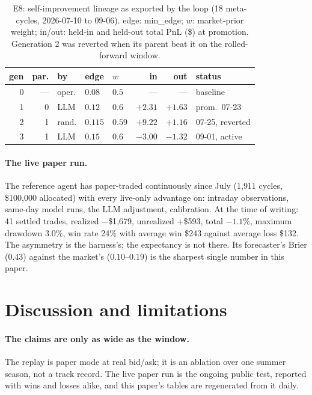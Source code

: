 \documentclass[sigconf,review,anonymous]{acmart}
\begin{document}
\begin{table}[t]
\centering
\small
\begin{tabular}{@{}rrlllrrl@{}}
\toprule
\textbf{gen} & \textbf{par.} & \textbf{by} & \textbf{edge} & \textbf{$w$} & \textbf{in} & \textbf{out} & \textbf{status} \\
\midrule
0 & --- & oper. & $0.08$ & $0.5$ & --- & --- & baseline \\
1 & 0 & LLM & $0.12$ & $0.6$ & $+2.31$ & $+1.63$ & prom.\ 07-23 \\
2 & 1 & rand. & $0.115$ & $0.59$ & $+9.22$ & $+1.16$ & 07-25, reverted \\
3 & 1 & LLM & $0.15$ & $0.6$ & $-3.00$ & $-1.32$ & 09-01, active \\
\bottomrule
\end{tabular}
\caption{E8: self-improvement lineage as exported by the loop (18 meta-cycles,
2026-07-10 to 09-06). edge: min\_edge; $w$: market-prior weight; in/out:
held-in and held-out total PnL (\$) at promotion. Generation 2 was reverted when its
parent beat it on the rolled-forward window.}
\label{tab:lineage}
\end{table}

\paragraph{The live paper run.}
\label{sec:live}
The reference agent has paper-traded continuously since July (1{,}911 cycles,
\$100{,}000 allocated) with every live-only advantage on: intraday
observations, same-day model runs, the LLM adjustment, calibration. At the
time of writing: 41 settled trades, realized $-$\$1{,}679, unrealized
$+$\$593, total $-1.1\%$, maximum drawdown $3.0\%$, win rate 24\% with average
win \$243 against average loss \$132. The asymmetry is the harness's; the
expectancy is not there. Its forecaster's Brier ($0.43$) against the market's
($0.10$--$0.19$) is the sharpest single number in this paper.

\section{Discussion and limitations}

\paragraph{The claims are only as wide as the window.} The replay is paper
mode at real bid/ask; it is an ablation over one summer season, not a track
record. The live paper run is the ongoing public test, reported with wins and
losses alike, and this paper's tables are regenerated from it daily.
\end{document}
